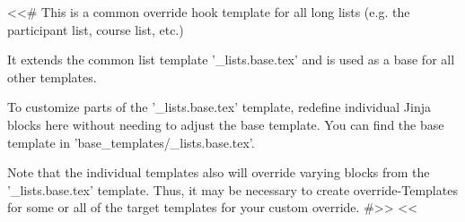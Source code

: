 <<# This is a common override hook template for all long lists (e.g. the participant list, course list, etc.)

    It extends the common list template '_lists.base.tex' and is used as a base for all other templates.

    To customize parts of the '_lists.base.tex' template, redefine individual Jinja blocks here without needing to
    adjust the base template. You can find the base template in 'base_templates/_lists.base.tex'.

    Note that the individual templates also will override varying blocks from the '_lists.base.tex' template. Thus, it
    may be necessary to create override-Templates for some or all of the target templates for your custom override.
#>>
<<%
